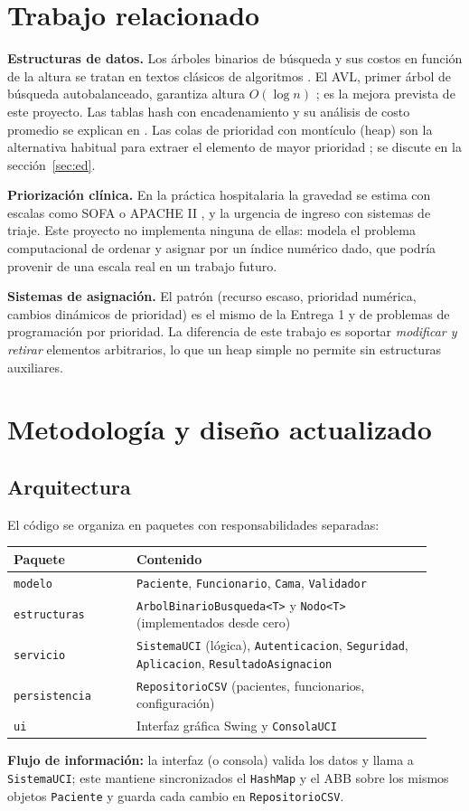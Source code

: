 \documentclass[11pt,a4paper]{article}
\begin{document}
\section{Trabajo relacionado}
\textbf{Estructuras de datos.} Los árboles binarios de búsqueda y sus costos en función de la altura se tratan en textos clásicos de algoritmos \cite{cormen,sedgewick}. El AVL, primer árbol de búsqueda autobalanceado, garantiza altura $O(\log n)$ \cite{avl}; es la mejora prevista de este proyecto. Las tablas hash con encadenamiento y su análisis de costo promedio se explican en \cite{cormen}. Las colas de prioridad con montículo (heap) son la alternativa habitual para extraer el elemento de mayor prioridad \cite{cormen}; se discute en la sección~\ref{sec:ed}.

\textbf{Priorización clínica.} En la práctica hospitalaria la gravedad se estima con escalas como SOFA \cite{sofa} o APACHE II \cite{apache}, y la urgencia de ingreso con sistemas de triaje. Este proyecto no implementa ninguna de ellas: modela el problema computacional de ordenar y asignar por un índice numérico dado, que podría provenir de una escala real en un trabajo futuro.

\textbf{Sistemas de asignación.} El patrón (recurso escaso, prioridad numérica, cambios dinámicos de prioridad) es el mismo de la Entrega 1 y de problemas de programación por prioridad. La diferencia de este trabajo es soportar \emph{modificar y retirar} elementos arbitrarios, lo que un heap simple no permite sin estructuras auxiliares.

\section{Metodología y diseño actualizado}
\subsection{Arquitectura}
El código se organiza en paquetes con responsabilidades separadas:
\begin{longtable}{@{}p{0.27\linewidth}p{0.65\linewidth}@{}}
\toprule \textbf{Paquete} & \textbf{Contenido}\\ \midrule
\texttt{modelo} & \texttt{Paciente}, \texttt{Funcionario}, \texttt{Cama}, \texttt{Validador}\\
\texttt{estructuras} & \texttt{ArbolBinarioBusqueda<T>} y \texttt{Nodo<T>} (implementados desde cero)\\
\texttt{servicio} & \texttt{SistemaUCI} (lógica), \texttt{Autenticacion}, \texttt{Seguridad}, \texttt{Aplicacion}, \texttt{ResultadoAsignacion}\\
\texttt{persistencia} & \texttt{RepositorioCSV} (pacientes, funcionarios, configuración)\\
\texttt{ui} & Interfaz gráfica Swing y \texttt{ConsolaUCI}\\
\bottomrule
\end{longtable}
\textbf{Flujo de información:} la interfaz (o consola) valida los datos y llama a \texttt{SistemaUCI}; este mantiene sincronizados el \texttt{HashMap} y el ABB sobre los mismos objetos \texttt{Paciente} y guarda cada cambio en \texttt{RepositorioCSV}.
\end{document}
